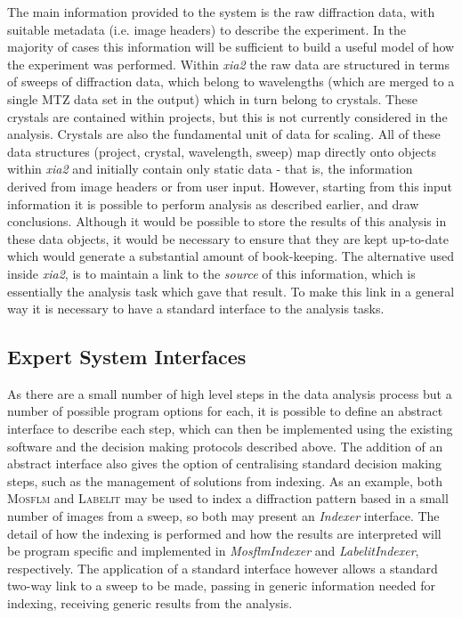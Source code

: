 \documentclass[preprint,pdf]{iucr}
\begin{document}
The main information provided to the system is the raw diffraction
data, with suitable metadata (i.e. image headers) to describe the
experiment. In the majority of
cases this information will be sufficient to build
a useful model of how the experiment was performed. Within \emph{xia2}
the raw data are 
structured in terms of sweeps of diffraction data, which belong to
wavelengths (which are merged to a single MTZ data set in the output)
which in turn belong to crystals. These crystals are contained within
projects, but this is not currently considered in the analysis. Crystals
are also the fundamental unit of data for scaling. All of these
data structures (project, crystal, wavelength, sweep) map directly onto
objects within \emph{xia2} and initially contain only static data -
that is, the information derived from image headers or from user
input. However, starting from this input information it is possible to
perform analysis as described earlier, and draw 
conclusions. Although it would be possible to store the results of
this analysis in these data objects, it would be necessary to ensure
that they are kept up-to-date which would generate a substantial
amount of book-keeping. The alternative used inside
\emph{xia2}, is to maintain a link to the
\emph{source} of this information, which is essentially the analysis
task which gave that result. To make this link in a general
way it is necessary to have a standard interface to the analysis
tasks.

\subsection{Expert System Interfaces}

As there are a small number of high level steps in the data analysis
process but a number of possible program options for each, it is
possible to define an abstract interface to describe each step, which
can then be implemented using the existing software 
and the decision making protocols described above. The addition of an
abstract interface also gives the option of centralising standard
decision making steps, such as the management of solutions from
indexing. As an example, both \textsc{Mosflm} and \textsc{Labelit} may be used to index
a diffraction pattern based in a small number of images from a sweep,
so both may present an \emph{Indexer} interface. The detail of how the
indexing is performed and how the results are interpreted will be
program specific and implemented in \emph{MosflmIndexer} and
\emph{LabelitIndexer}, respectively. The application of a standard
interface however allows a standard two-way link to a sweep to be
made, passing in generic information needed for indexing, receiving
generic results from the analysis.
\end{document}
